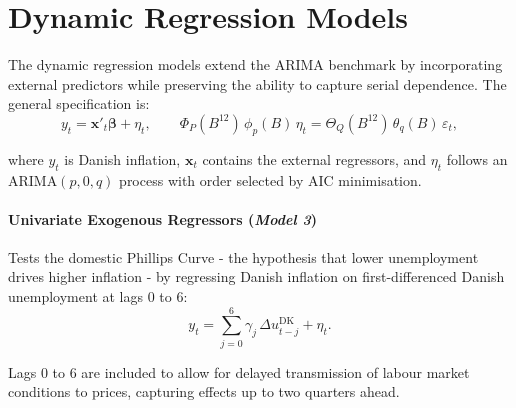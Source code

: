 \section{Dynamic Regression Models} \label{sec:dynregmodel}

The dynamic regression models extend the ARIMA benchmark by incorporating
external predictors while preserving the ability to capture serial dependence.
The general specification is:
\begin{equation}
    y_t = \mathbf{x}'_t\boldsymbol{\beta} + \eta_t, \qquad
\Phi_P(B^{12})\,\phi_p(B)\,\eta_t = \Theta_Q(B^{12})\,\theta_q(B)\,\varepsilon_t,
\end{equation}

where $y_t$ is Danish inflation, $\mathbf{x}_t$ contains the external
regressors, and $\eta_t$ follows an ARIMA$(p,0,q)$ process with order selected
by AIC minimisation.

\paragraph{Univariate Exogenous Regressors (\textit{Model 3})} Tests the domestic Phillips Curve - the hypothesis that lower unemployment drives higher inflation - by regressing Danish inflation on first-differenced Danish unemployment at lags 0 to 6:
\begin{equation}
    y_t = \sum_{j=0}^{6} \gamma_j\,\Delta u^{\text{DK}}_{t-j} + \eta_t.
\end{equation}

Lags 0 to 6 are included to allow for delayed transmission of labour market
conditions to prices, capturing effects up to two quarters ahead.

